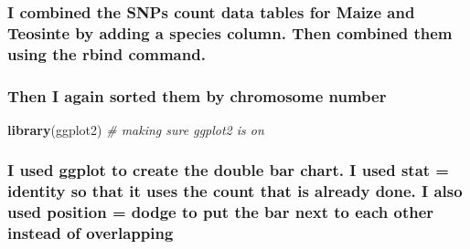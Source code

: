 \documentclass[
]{article}
\newenvironment{Shaded}{\begin{snugshade}}{\end{snugshade}}
\newcommand{\AttributeTok}[1]{\textcolor[rgb]{0.13,0.29,0.53}{#1}}
\newcommand{\CommentTok}[1]{\textcolor[rgb]{0.56,0.35,0.01}{\textit{#1}}}
\newcommand{\DecValTok}[1]{\textcolor[rgb]{0.00,0.00,0.81}{#1}}
\newcommand{\FunctionTok}[1]{\textcolor[rgb]{0.13,0.29,0.53}{\textbf{#1}}}
\newcommand{\NormalTok}[1]{#1}
\newcommand{\OtherTok}[1]{\textcolor[rgb]{0.56,0.35,0.01}{#1}}
\newcommand{\SpecialCharTok}[1]{\textcolor[rgb]{0.81,0.36,0.00}{\textbf{#1}}}
\newcommand{\StringTok}[1]{\textcolor[rgb]{0.31,0.60,0.02}{#1}}
\begin{document}
\subsubsection{I combined the SNPs count data tables for Maize and
Teosinte by adding a species column. Then combined them using the rbind
command.}\label{i-combined-the-snps-count-data-tables-for-maize-and-teosinte-by-adding-a-species-column.-then-combined-them-using-the-rbind-command.}

\subsubsection{Then I again sorted them by chromosome
number}\label{then-i-again-sorted-them-by-chromosome-number}

\begin{Shaded}
\end{Shaded}

\begin{Shaded}
\begin{Highlighting}[]
\FunctionTok{library}\NormalTok{(ggplot2) }\CommentTok{\# making sure ggplot2 is on}
\end{Highlighting}
\end{Shaded}

\subsubsection{I used ggplot to create the double bar chart. I used stat
= identity so that it uses the count that is already done. I also used
position = dodge to put the bar next to each other instead of
overlapping}\label{i-used-ggplot-to-create-the-double-bar-chart.-i-used-stat-identity-so-that-it-uses-the-count-that-is-already-done.-i-also-used-position-dodge-to-put-the-bar-next-to-each-other-instead-of-overlapping}
\end{document}
